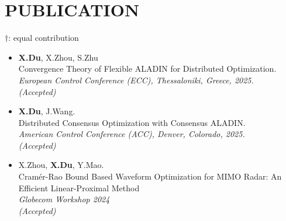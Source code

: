 \documentclass[paper=a4,fontsize=11pt]{scrartcl} %
\newcommand{\NewPart}[1]{\section*{\uppercase{#1}}}
\newcommand{\EducationEntry}[4]{
		\noindent \textbf{#1} \hfill      %
		\colorbox{White}{%
			\parbox{5cm}{%
			\hfill\color{Black}#2}} \par  %
		\noindent \textit{#3} \par        %
		\noindent\hangindent=2em\hangafter=0 \small #4 %
		\normalsize \par}
\begin{document}
\NewPart{PUBLICATION}{}
$\dag$:  equal contribution
\begin{itemize}
	
		
	\item  {\textbf{X.Du}, X.Zhou, S.Zhu \\
		{ Convergence Theory of Flexible ALADIN for Distributed Optimization.}\\
		\emph{European Control Conference (ECC), Thessaloniki, Greece, 2025.\\(Accepted)
	} }
	
		\item  {\textbf{X.Du}, J.Wang. \\
		{ Distributed Consensus Optimization with Consensus ALADIN.}\\
		\emph{American Control Conference (ACC), Denver, Colorado, 2025.\\(Accepted)
	} }
	
		\item  {X.Zhou, \textbf{X.Du},   Y.Mao. \\
		{Cram\'er-Rao Bound Based Waveform Optimization for MIMO Radar: An Efficient Linear-Proximal Method}\\
		\emph{Globecom Workshop 2024\\
			(Accepted)
	} }
	
	
%	


\end{itemize}
\end{document}
